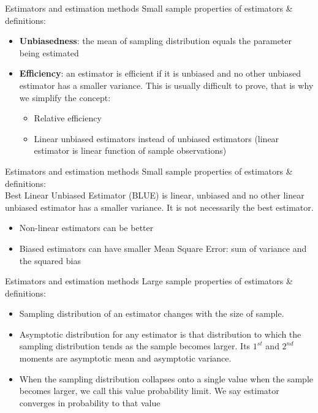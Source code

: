 \documentclass{beamer}
\begin{document}
\begin{frame}{Estimators and estimation methods}
Small sample properties of estimators \& definitions:
\vspace{0.3cm}
\begin{itemize}
\item \textbf{Unbiasedness}: the mean of sampling distribution equals the parameter being estimated
\vspace{0.3cm}
\item \textbf{Efficiency}: an estimator is efficient if it is unbiased and no other
unbiased estimator has a smaller variance. This is usually difficult to prove, that is why we simplify the concept:
\vspace{0.3cm}
\begin{itemize}
\item Relative efficiency
\vspace{0.3cm}
\item Linear unbiased estimators instead of unbiased estimators (linear estimator is linear function of sample observations)
\end{itemize}
\end{itemize}
\end{frame}
\begin{frame}{Estimators and estimation methods}
Small sample properties of estimators \& definitions:\\
\vspace{0.5cm}
Best Linear Unbiased Estimator (BLUE) is linear, unbiased and no other linear unbiased estimator has a smaller variance. It is not necessarily the best estimator.
\vspace{0.5cm}
\begin{itemize}
\item Non-linear estimators can be better
\item Biased estimators can have smaller Mean Square Error: sum of variance and the squared bias
\end{itemize}
\end{frame}
\begin{frame}{Estimators and estimation methods}
Large sample properties of estimators \& definitions:
\vspace{0.3cm}
\begin{itemize}
\item Sampling distribution of an estimator changes with the size of sample. 
\vspace{0.3cm}
\item Asymptotic distribution for any estimator is that distribution to which the sampling distribution tends as the sample becomes larger. Its $1^{st}$ and $2^{nd}$ moments are asymptotic mean and asymptotic variance.
\vspace{0.3cm}
\item When the sampling distribution collapses onto a single value when the sample becomes larger, we call this value probability limit. We say estimator converges in probability to that value
\end{itemize}
\end{frame}
\end{document}
